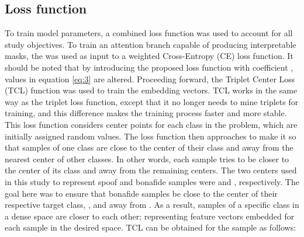 \documentclass[a4paper]{article}
\begin{document}
\subsection{Loss function}
To train model parameters, a combined loss function was used to account for all study objectives. To train an attention branch capable of producing interpretable masks, the  was used as input to a weighted Cross-Entropy (CE) loss function. It should be noted that by introducing the proposed loss function with coefficient , values in equation \ref{eq:3} are altered. Proceeding forward, the Triplet Center Loss (TCL) function was used to train the embedding vectors. TCL works in the same way as the triplet loss function, except that it no longer needs to mine triplets for training, and this difference makes the training process faster and more stable. This loss function considers center points for each class in the problem, which are initially assigned random values. The loss function then approaches to make it so that samples of one class are close to the center of their class and away from the nearest center of other classes. In other words, each sample tries to be closer to the center of its class and away from the remaining centers.  The two centers used in this study to represent spoof and bonafide samples were  and , respectively. The goal here was to ensure that bonafide samples be close to the center of their respective target class, , and away from . As a result, samples of a specific class in a dense space are closer to each other; representing feature vectors embedded for each sample in the desired space. TCL can be obtained for the  sample as follows:
\end{document}
